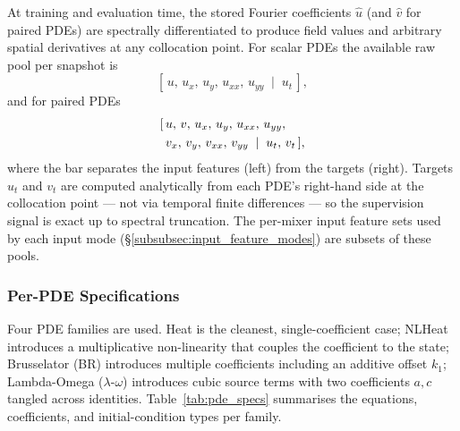 \documentclass[10pt,journal,compsoc]{IEEEtran}
\begin{document}
At training and evaluation time, the stored Fourier coefficients
$\hat{u}$ (and $\hat{v}$ for paired PDEs) are spectrally differentiated
to produce field values and arbitrary spatial derivatives at any
collocation point. For scalar PDEs the available raw pool per snapshot
is
\begin{equation}\label{eq:scalar_pool}
[\,u,\, u_x,\, u_y,\, u_{xx},\, u_{yy}\;\mid\;u_t\,],
\end{equation}
and for paired PDEs
\begin{equation}\label{eq:paired_pool}
\begin{aligned}
\relax[\,&u,\, v,\, u_x,\, u_y,\, u_{xx},\, u_{yy}, \\
   &v_x,\, v_y,\, v_{xx},\, v_{yy} \;\mid\; u_t,\, v_t\,],
\end{aligned}
\end{equation}
where the bar separates the input features (left) from the targets
(right). Targets $u_t$ and $v_t$ are computed analytically from each
PDE's right-hand side at the collocation point --- not via temporal
finite differences --- so the supervision signal is exact up to spectral
truncation. The per-mixer input feature sets used by each input mode
(\S\ref{subsubsec:input_feature_modes}) are subsets of these pools.

\subsubsection{Per-PDE Specifications}\label{subsubsec:pde_specs}

Four PDE families are used. Heat is the cleanest, single-coefficient case;
NLHeat introduces a multiplicative non-linearity that couples the
coefficient to the state; Brusselator (BR) introduces multiple coefficients
including an additive offset $k_1$; Lambda-Omega ($\lambda$-$\omega$)
introduces cubic source terms with two coefficients $a, c$ tangled across
identities. Table~\ref{tab:pde_specs} summarises the equations,
coefficients, and initial-condition types per family.
\end{document}
